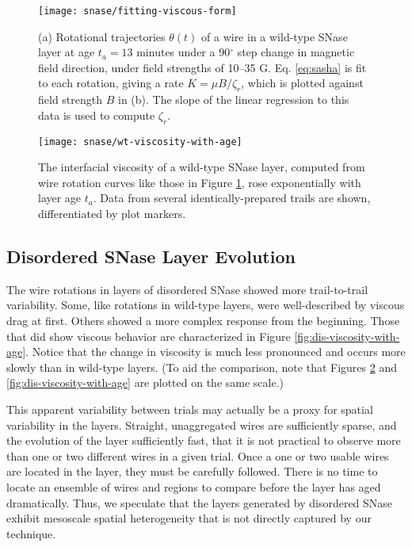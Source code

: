    \begin{figure}
    \centering
    \texttt{[image: snase/fitting-viscous-form]} %
    \caption{\label{fig:fitting-viscous-form}(a) Rotational trajectories $\theta(t)$ of a wire in a wild-type SNase layer at age $t_a=13$ minutes under a 90$^\circ$ step change in magnetic field direction, under field strengths of 10--35 G. Eq. \ref{eq:sasha} is fit to each rotation, giving a rate $K=\mu B/\zeta_r$, which is plotted against field strength $B$ in (b). The slope of the linear regression to this data is used to compute $\zeta_r$.}
    \end{figure}

   \begin{figure}
    \centering
    \texttt{[image: snase/wt-viscosity-with-age]}
    \caption{\label{fig:wt-viscosity-with-age}The interfacial viscosity of a wild-type SNase layer, computed from wire rotation curves like those in Figure \ref{fig:fitting-viscous-form}, rose exponentially with layer age $t_a$. Data from several identically-prepared trails are shown, differentiated by plot markers.}
    \end{figure}
   

\subsection{Disordered SNase Layer Evolution}

The wire rotations in layers of disordered SNase showed more trail-to-trail variability. Some, like rotations in wild-type layers, were well-described by viscous drag at first. Others showed a more complex response from the beginning. Those that did show viscous behavior are characterized in Figure \ref{fig:dis-viscosity-with-age}. Notice that the change in viscosity is much less pronounced and occurs more slowly than in wild-type layers. (To aid the comparison, note that Figures \ref{fig:wt-viscosity-with-age} and \ref{fig:dis-viscosity-with-age} are plotted on the same scale.)

This apparent variability between trials may actually be a proxy for spatial variability in the layers. Straight, unaggregated wires are sufficiently sparse, and the evolution of the layer sufficiently fast, that it is not practical to observe more than one or two different wires in a given trial. Once a one or two usable wires are located in the layer, they must be carefully followed. There is no time to locate an ensemble of wires and regions to compare before the layer has aged dramatically. Thus, we speculate that the layers generated by disordered SNase exhibit mesoscale spatial heterogeneity that is not directly captured by our technique.

